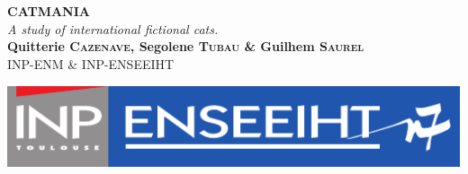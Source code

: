 \documentclass[a0,portrait,20pt]{a0poster}
\begin{document}


\begin{minipage}[b]{0.75\linewidth}
\veryHuge \color{NavyBlue} \textbf{CATMANIA} \color{Black}\\ %
\Huge\textit{A study of international fictional cats.}\\[2cm] %
\huge \textbf{Quitterie \textsc{Cazenave}, Segolene \textsc{Tubau} \& Guilhem \textsc{Saurel}}\\[0.5cm] %
\huge INP-ENM \& INP-ENSEEIHT\\[0.4cm] %
\end{minipage}
%
\begin{minipage}[b]{0.25\linewidth}
\includegraphics[width=20cm]{logo.png}\\
\end{minipage}

\vspace{1cm} %

\end{document}
